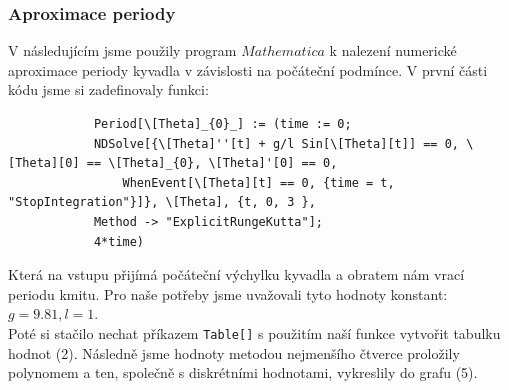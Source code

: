 \documentclass[reqno, a4paper]{amsart}
\begin{document}
		\subsubsection{Aproximace periody}
		\label{sec:aprox-periody}
		V následujícím jsme použily program $Mathematica$ k nalezení numerické aproximace periody kyvadla v závislosti na počáteční podmínce.
		V první části kódu jsme si zadefinovaly funkci:
		\begin{verbatim}
			Period[\[Theta]_{0}_] := (time := 0; 
			NDSolve[{\[Theta]''[t] + g/l Sin[\[Theta][t]] == 0, \[Theta][0] == \[Theta]_{0}, \[Theta]'[0] == 0, 
				WhenEvent[\[Theta][t] == 0, {time = t, "StopIntegration"}]}, \[Theta], {t, 0, 3 },
			Method -> "ExplicitRungeKutta"];
			4*time)
		\end{verbatim}
		Která na vstupu přijímá počáteční výchylku kyvadla a obratem nám vrací periodu kmitu. Pro naše potřeby jsme uvažovali tyto hodnoty konstant: $g=9.81, l=1$.\\
		Poté si stačilo nechat příkazem \verb|Table[]| s použitím naší funkce vytvořit tabulku hodnot (2). Následně jsme hodnoty metodou nejmenšího čtverce proložily polynomem a ten, společně s diskrétními hodnotami, vykreslily do grafu (5).\\
\end{document}
